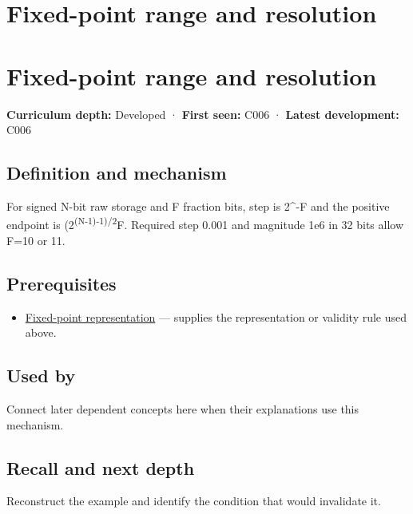 \hypertarget{appendix-ceb4c4a9b5a1}{}
\section*{Fixed-point range and resolution}
\section{Fixed-point range and resolution}\label{appendix-ceb4c4a9b5a1-fixed-point-range-and-resolution}

\textbf{Curriculum depth:} Developed · \textbf{First seen:} C006 · \textbf{Latest development:} C006

\subsection{Definition and mechanism}\label{appendix-ceb4c4a9b5a1-definition-and-mechanism}

For signed N-bit raw storage and F fraction bits, step is 2\^{}-F and the positive endpoint is (2\textsuperscript{(N-1)-1)/2}F. Required step 0.001 and magnitude 1e6 in 32 bits allow F=10 or 11.

\subsection{Prerequisites}\label{appendix-ceb4c4a9b5a1-prerequisites}

\begin{itemize}
\tightlist
\item
  \hyperref[appendix-1d0dbe8924cc]{Fixed-point representation} --- supplies the representation or validity rule used above.
\end{itemize}

\subsection{Used by}\label{appendix-ceb4c4a9b5a1-used-by}

Connect later dependent concepts here when their explanations use this mechanism.

\subsection{Recall and next depth}\label{appendix-ceb4c4a9b5a1-recall-and-next-depth}

Reconstruct the example and identify the condition that would invalidate it.

